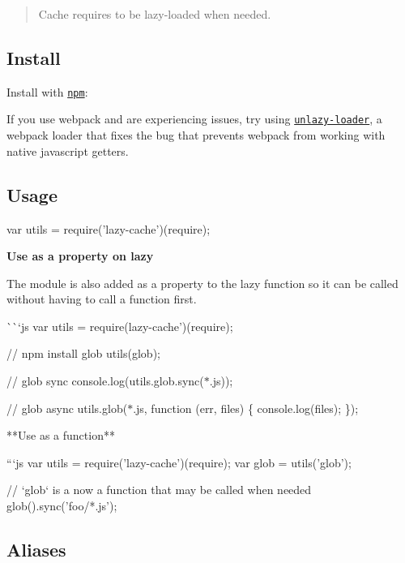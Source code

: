 \begin{quote}
Cache requires to be lazy-\/loaded when needed. \end{quote}


\subsection*{Install}

Install with \href{https://www.npmjs.com/}{\tt npm}\+:




If you use webpack and are experiencing issues, try using \href{https://github.com/doowb/unlazy-loader}{\tt unlazy-\/loader}, a webpack loader that fixes the bug that prevents webpack from working with native javascript getters.

\subsection*{Usage}


\begin{DoxyCode}
var utils = require('lazy-cache')(require);
\end{DoxyCode}


{\bfseries Use as a property on {\ttfamily lazy}}

The module is also added as a property to the {\ttfamily lazy} function so it can be called without having to call a function first.

\`{}\`{}`js var utils = require(\textquotesingle{}lazy-\/cache')(require);

// {\ttfamily npm install glob} utils(\textquotesingle{}glob\textquotesingle{});

// glob sync console.\+log(utils.\+glob.\+sync(\textquotesingle{}$\ast$.js\textquotesingle{}));

// glob async utils.\+glob(\textquotesingle{}$\ast$.js\textquotesingle{}, function (err, files) \{ console.\+log(files); \}); 
\begin{DoxyCode}
**Use as a function**

```js
var utils = require('lazy-cache')(require);
var glob = utils('glob');

// `glob` is a now a function that may be called when needed
glob().sync('foo/*.js');
\end{DoxyCode}


\subsection*{Aliases}

